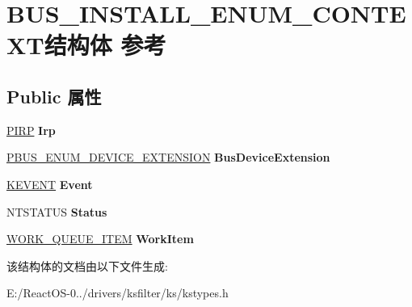 \hypertarget{struct_b_u_s___i_n_s_t_a_l_l___e_n_u_m___c_o_n_t_e_x_t}{}\section{B\+U\+S\+\_\+\+I\+N\+S\+T\+A\+L\+L\+\_\+\+E\+N\+U\+M\+\_\+\+C\+O\+N\+T\+E\+X\+T结构体 参考}
\label{struct_b_u_s___i_n_s_t_a_l_l___e_n_u_m___c_o_n_t_e_x_t}
\subsection*{Public 属性}
\begin{DoxyCompactItemize}
\item 
\mbox{\label{struct_b_u_s___i_n_s_t_a_l_l___e_n_u_m___c_o_n_t_e_x_t_a29c92fad8579106eeb1b2ae0a3a34138}} 
\hyperlink{interfacevoid}{P\+I\+RP} {\bfseries Irp}
\item 
\mbox{\label{struct_b_u_s___i_n_s_t_a_l_l___e_n_u_m___c_o_n_t_e_x_t_a2525a88a8ee47a5004ffafe1a9efe1c6}} 
\hyperlink{struct_____b_u_s___e_n_u_m___d_e_v_i_c_e___e_x_t_e_n_s_i_o_n____}{P\+B\+U\+S\+\_\+\+E\+N\+U\+M\+\_\+\+D\+E\+V\+I\+C\+E\+\_\+\+E\+X\+T\+E\+N\+S\+I\+ON} {\bfseries Bus\+Device\+Extension}
\item 
\mbox{\label{struct_b_u_s___i_n_s_t_a_l_l___e_n_u_m___c_o_n_t_e_x_t_a4f1338b5615c6b356a4717737563c708}} 
\hyperlink{struct___k_e_v_e_n_t}{K\+E\+V\+E\+NT} {\bfseries Event}
\item 
\mbox{\label{struct_b_u_s___i_n_s_t_a_l_l___e_n_u_m___c_o_n_t_e_x_t_aa59ac80d7ca3043c203bc43b129316c0}} 
N\+T\+S\+T\+A\+T\+US {\bfseries Status}
\item 
\mbox{\label{struct_b_u_s___i_n_s_t_a_l_l___e_n_u_m___c_o_n_t_e_x_t_ad519dc2adfda4c3fbdaf3bd77e6feddf}} 
\hyperlink{struct___w_o_r_k___q_u_e_u_e___i_t_e_m}{W\+O\+R\+K\+\_\+\+Q\+U\+E\+U\+E\+\_\+\+I\+T\+EM} {\bfseries Work\+Item}
\end{DoxyCompactItemize}


该结构体的文档由以下文件生成\+:\begin{DoxyCompactItemize}
\item 
E\+:/\+React\+O\+S-\/0../drivers/ksfilter/ks/kstypes.\+h\end{DoxyCompactItemize}

